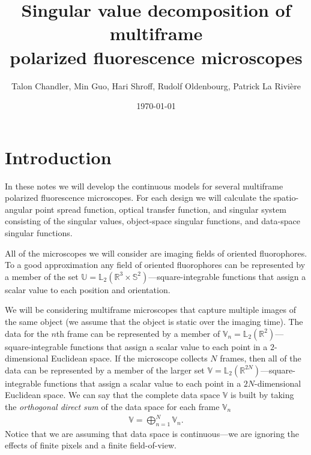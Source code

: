 \documentclass[11pt]{article}
\providecommand{\mbb}[1]{\mathbb{#1}}
\begin{document}
\title{\vspace{-2.5em} Singular value decomposition of multiframe\\ polarized
  fluorescence microscopes\vspace{-1em}} \author{Talon Chandler, Min Guo, Hari
  Shroff, Rudolf Oldenbourg, Patrick La Rivi\`ere}
\date{\vspace{-1em}\today\vspace{-1em}}
\maketitle
\section{Introduction}

In these notes we will develop the continuous models for several multiframe
polarized fluorescence microscopes. For each design we will calculate the
spatio-angular point spread function, optical transfer function, and singular
system consisting of the singular values, object-space singular functions, and
data-space singular functions.

All of the microscopes we will consider are imaging fields of oriented
fluorophores. To a good approximation any field of oriented fluorophores can be
represented by a member of the set
$\mbb{U} = \mbb{L}_2(\mbb{R}^3 \times \mbb{S}^2)$---square-integrable functions
that assign a scalar value to each position and orientation.

We will be considering multiframe microscopes that capture multiple images of
the same object (we assume that the object is static over the imaging time). The
data for the $n$th frame can be represented by a member of
$\mbb{V}_n = \mbb{L}_2(\mbb{R}^{2})$---square-integrable functions that assign a
scalar value to each point in a $2$-dimensional Euclidean space. If the
microscope collects $N$ frames, then all of the data can be represented by a
member of the larger set $\mbb{V} = \mbb{L}_2(\mbb{R}^{2N})$---square-integrable
functions that assign a scalar value to each point in a $2N$-dimensional
Euclidean space. We can say that the complete data space $\mbb{V}$ is built by
taking the \textit{orthogonal direct sum} of the data space for each frame
$\mbb{V}_n$
\begin{align}
  \mbb{V} = \bigoplus_{n=1}^N \mbb{V}_n.
\end{align}
Notice that we are assuming that data space is continuous---we are ignoring the
effects of finite pixels and a finite field-of-view.
\end{document}
